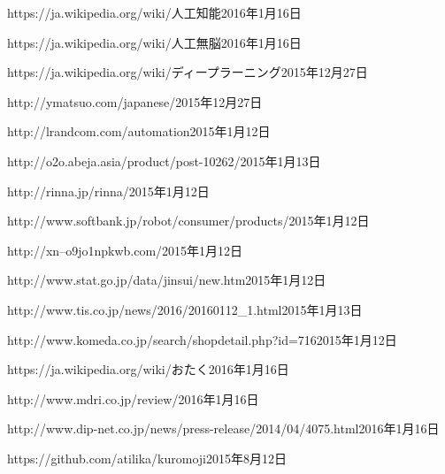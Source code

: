\documentclass[a4paper,10pt,onecolumn,oneside,openany]{jsbook}
\begin{document}
\begin{thebibliography}{99}

	{https://ja.wikipedia.org/wiki/人工知能}{2016年1月16日}

	{https://ja.wikipedia.org/wiki/人工無脳}{2016年1月16日}

	{https://ja.wikipedia.org/wiki/ディープラーニング}{2015年12月27日}

	{http://ymatsuo.com/japanese/}{2015年12月27日}

	{http://lrandcom.com/automation}{2015年1月12日}

	{http://o2o.abeja.asia/product/post-10262/}{2015年1月13日}

	{http://rinna.jp/rinna/}{2015年1月12日}

	{http://www.softbank.jp/robot/consumer/products/}{2015年1月12日}

	{http://xn--o9jo1npkwb.com/}{2015年1月12日}

	{http://www.stat.go.jp/data/jinsui/new.htm}{2015年1月12日}

	{http://www.tis.co.jp/news/2016/20160112_1.html}{2015年1月13日}

	{http://www.komeda.co.jp/search/shopdetail.php?id=716}{2015年1月12日}

	{https://ja.wikipedia.org/wiki/おたく}{2016年1月16日}

	{http://www.mdri.co.jp/review/}{2016年1月16日}

	{http://www.dip-net.co.jp/news/press-release/2014/04/4075.html}{2016年1月16日}







	{https://github.com/atilika/kuromoji}{2015年8月12日}

\end{thebibliography}
\end{document}
